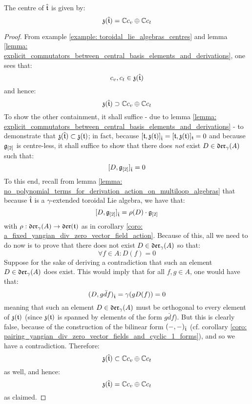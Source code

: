         \begin{proposition} \label{prop: centres_of_yangian_extended_toroidal_lie_algebras}
            The centre of $\hat{\mathfrak{t}}$ is given by:
                $$\mathfrak{z}(\hat{\mathfrak{t}}) = \mathbb{C} c_v \oplus \mathbb{C} c_t$$
        \end{proposition}
            \begin{proof}
                From example \ref{example: toroidal_lie_algebras_centres} and lemma \ref{lemma: explicit_commutators_between_central_basis_elements_and_derivations}, one sees that:
                    $$c_v, c_t \in \mathfrak{z}(\hat{\mathfrak{t}})$$
                and hence:
                    $$\mathfrak{z}(\hat{\mathfrak{t}}) \supset \mathbb{C} c_v \oplus \mathbb{C} c_t$$
                To show the other containment, it shall suffice - due to lemma \ref{lemma: explicit_commutators_between_central_basis_elements_and_derivations} - to demonstrate that $\mathfrak{z}(\hat{\mathfrak{t}}) \subset \mathfrak{z}(\mathfrak{t})$; in fact, because $[\mathfrak{t}, \mathfrak{z}(\mathfrak{t})]_{\hat{\mathfrak{t}}} = [\mathfrak{t}, \mathfrak{z}(\mathfrak{t})]_{\mathfrak{t}} = 0$ and because $\mathfrak{g}_{[2]}$ is centre-less, it shall suffice to show that there does \textit{not} exist $D \in \mathfrak{der}_{\gamma}(A)$ such that:
                    $$[D, \mathfrak{g}_{[2]}]_{\hat{\mathfrak{t}}} = 0$$
                To this end, recall from lemma \ref{lemma: no_polynomial_terms_for_derivation_action_on_multiloop_algebras} that because $\hat{\mathfrak{t}}$ is a $\gamma$-extended toroidal Lie algebra, we have that:
                    $$[D, \mathfrak{g}_{[2]}]_{\hat{\mathfrak{t}}} = \rho(D) \cdot \mathfrak{g}_{[2]}$$
                with $\rho: \mathfrak{der}_{\gamma}(A) \to \mathfrak{der}(\mathfrak{t})$ as in corollary \ref{coro: a_fixed_yangian_div_zero_vector_field_action}. Because of this, all we need to do now is to prove that there does not exist $D \in \mathfrak{der}_{\gamma}(A)$ so that:
                    $$\forall f \in A: D(f) = 0$$
                Suppose for the sake of deriving a contradiction that such an element $D \in \mathfrak{der}_{\gamma}(A)$ does exist. This would imply that for all $f, g \in A$, one would have that:
                    $$(D, g \bar{d}f)_{\hat{\mathfrak{t}}} = \gamma( g D(f) ) = 0$$
                meaning that such an element $D \in \mathfrak{der}_{\gamma}(A)$ must be orthogonal to every element of $\mathfrak{z}(\mathfrak{t})$ (since $\mathfrak{z}(\mathfrak{t})$ is spanned by elements of the form $g \bar{d}f$). But this is clearly false, because of the construction of the bilinear form $(-, -)_{\hat{\mathfrak{t}}}$ (cf. corollary \ref{coro: pairing_yangian_div_zero_vector_fields_and_cyclic_1_forms}), and so we have a contradiction. Therefore:
                    $$\mathfrak{z}(\hat{\mathfrak{t}}) \subset \mathbb{C} c_v \oplus \mathbb{C} c_t$$
                as well, and hence:
                    $$\mathfrak{z}(\hat{\mathfrak{t}}) = \mathbb{C} c_v \oplus \mathbb{C} c_t$$
                as claimed.
            \end{proof}

